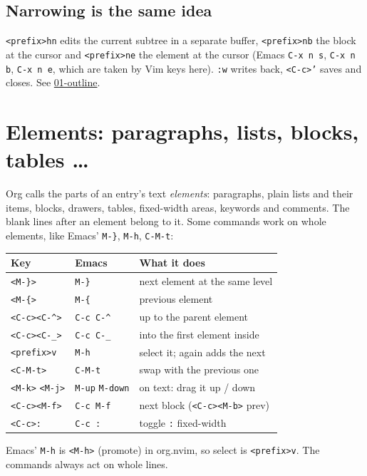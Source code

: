 \subsection{Narrowing is the same idea}
\label{sec:org3ec8003}
\texttt{<prefix>hn} edits the current subtree in a separate buffer, \texttt{<prefix>nb}
the block at the cursor and \texttt{<prefix>ne} the element at the cursor
(Emacs \texttt{C-x n s}, \texttt{C-x n b}, \texttt{C-x n e}, which are taken by Vim keys
here). \texttt{:w} writes back, \texttt{<C-c>'} saves and closes. See
\href{01-outline.org}{01-outline}.
\section{Elements: paragraphs, lists, blocks, tables \ldots{}}
\label{sec:orgfee8a47}
Org calls the parts of an entry's text \emph{elements}: paragraphs, plain
lists and their items, blocks, drawers, tables, fixed-width areas,
keywords and comments. The blank lines after an element belong to it.
Some commands work on whole elements, like Emacs' \texttt{M-\}}, \texttt{M-h}, \texttt{C-M-t}:

\begin{center}
\begin{tabular}{lll}
Key & Emacs & What it does\\
\hline
\texttt{<M-\}>} & \texttt{M-\}} & next element at the same level\\
\texttt{<M-\{>} & \texttt{M-\{} & previous element\\
\texttt{<C-c><C-\textasciicircum{}>} & \texttt{C-c C-\textasciicircum{}} & up to the parent element\\
\texttt{<C-c><C-\_>} & \texttt{C-c C-\_} & into the first element inside\\
\texttt{<prefix>v} & \texttt{M-h} & select it; again adds the next\\
\texttt{<C-M-t>} & \texttt{C-M-t} & swap with the previous one\\
\texttt{<M-k>} \texttt{<M-j>} & \texttt{M-up} \texttt{M-down} & on text: drag it up / down\\
\texttt{<C-c><M-f>} & \texttt{C-c M-f} & next block (\texttt{<C-c><M-b>} prev)\\
\texttt{<C-c>:} & \texttt{C-c :} & toggle \texttt{:} fixed-width\\
\end{tabular}
\end{center}

Emacs' \texttt{M-h} is \texttt{<M-h>} (promote) in org.nvim, so select is \texttt{<prefix>v}.
The commands always act on whole lines.
